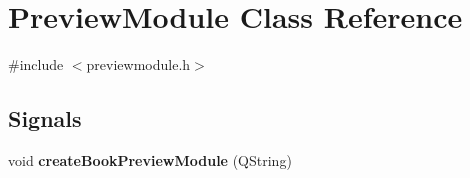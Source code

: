 \hypertarget{classPreviewModule}{
\section{PreviewModule Class Reference}
\label{classPreviewModule}
}


{\ttfamily \#include $<$previewmodule.h$>$}

\subsection*{Signals}
\begin{DoxyCompactItemize}
\item 
\hypertarget{classPreviewModule_af9f35818972e9caa6cb79371dbfc230a}{
void {\bfseries createBookPreviewModule} (QString)}
\label{classPreviewModule_af9f35818972e9caa6cb79371dbfc230a}

\end{DoxyCompactItemize}
